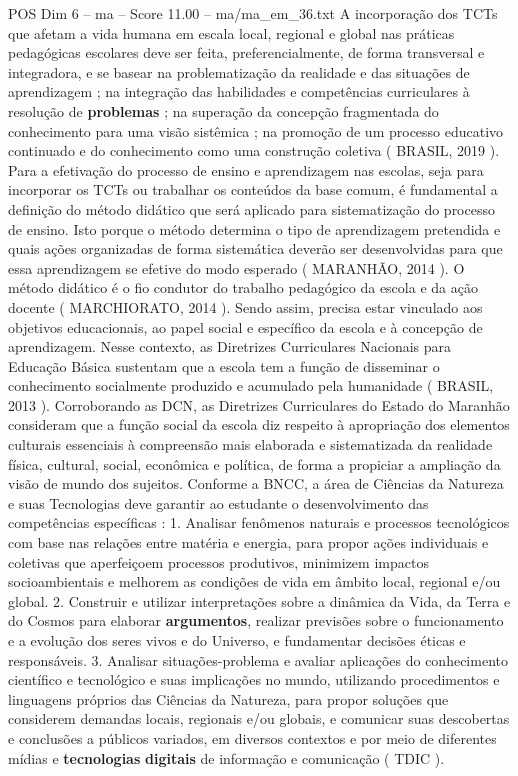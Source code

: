 \begin{textsample}{POS Dim 6 – ma – Score 11.00 – ma/ma\_em\_36.txt}
A incorporação dos TCTs que afetam a vida humana em escala local, regional e global nas práticas pedagógicas escolares deve ser feita, preferencialmente, de forma transversal e integradora, e se basear na problematização da realidade e das situações de aprendizagem ; na integração das habilidades e competências curriculares à resolução de \textbf{problemas} ; na superação da concepção fragmentada do conhecimento para uma visão sistêmica ; na promoção de um processo educativo continuado e do conhecimento como uma construção coletiva ( BRASIL, 2019 ).
Para a efetivação do processo de ensino e aprendizagem nas escolas, seja para incorporar os TCTs ou trabalhar os conteúdos da base comum, é fundamental a definição do método didático que será aplicado para sistematização do processo de ensino.
Isto porque o método determina o tipo de aprendizagem pretendida e quais ações organizadas de forma sistemática deverão ser desenvolvidas para que essa aprendizagem se efetive do modo esperado ( MARANHÃO, 2014 ).
O método didático é o fio condutor do trabalho pedagógico da escola e da ação docente ( MARCHIORATO, 2014 ).
Sendo assim, precisa estar vinculado aos objetivos educacionais, ao papel social e específico da escola e à concepção de aprendizagem.
Nesse contexto, as Diretrizes Curriculares Nacionais para Educação Básica sustentam que a escola tem a função de disseminar o conhecimento socialmente produzido e acumulado pela humanidade ( BRASIL, 2013 ).
Corroborando as DCN, as Diretrizes Curriculares do Estado do Maranhão consideram que a função social da escola diz respeito à apropriação dos elementos culturais essenciais à compreensão mais elaborada e sistematizada da realidade física, cultural, social, econômica e política, de forma a propiciar a ampliação da visão de mundo dos sujeitos.
Conforme a BNCC, a área de Ciências da Natureza e suas Tecnologias deve garantir ao estudante o desenvolvimento das competências específicas : 1.
Analisar fenômenos naturais e processos tecnológicos com base nas relações entre matéria e energia, para propor ações individuais e coletivas que aperfeiçoem processos produtivos, minimizem impactos socioambientais e melhorem as condições de vida em âmbito local, regional e/ou global. 2.
Construir e utilizar interpretações sobre a dinâmica da Vida, da Terra e do Cosmos para elaborar \textbf{argumentos}, realizar previsões sobre o funcionamento e a evolução dos seres vivos e do Universo, e fundamentar decisões éticas e responsáveis. 3.
Analisar situações-problema e avaliar aplicações do conhecimento científico e tecnológico e suas implicações no mundo, utilizando procedimentos e linguagens próprios das Ciências da Natureza, para propor soluções que considerem demandas locais, regionais e/ou globais, e comunicar suas descobertas e conclusões a públicos variados, em diversos contextos e por meio de diferentes mídias e \textbf{tecnologias} \textbf{digitais} de informação e comunicação ( TDIC ).

\end{textsample}
